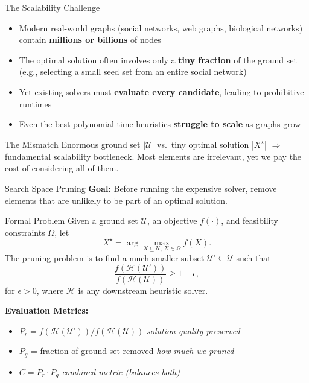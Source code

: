 \documentclass[aspectratio=169,xcolor=dvipsnames,8pt]{beamer}
\begin{document}
\begin{frame}{The Scalability Challenge}
  \begin{itemize}
    \item Modern real-world graphs (social networks, web graphs, biological networks)
      contain \textbf{millions or billions} of nodes
    \item The optimal solution often involves only a \textbf{tiny fraction} of the
      ground set (e.g., selecting a small seed set from an entire social network)
    \item Yet existing solvers must \textbf{evaluate every candidate}, leading to
      prohibitive runtimes
    \item Even the best polynomial-time heuristics \textbf{struggle to scale}
      as graphs grow
  \end{itemize}

  \vspace{0.4cm}

  \begin{alertblock}{The Mismatch}
    Enormous ground set $|\mathcal{U}|$ vs.\ tiny optimal solution $|X^\star|$
    $\Rightarrow$ fundamental scalability bottleneck. Most elements are irrelevant,
    yet we pay the cost of considering all of them.
  \end{alertblock}
\end{frame}

\begin{frame}{Search Space Pruning}
  \textbf{Goal:} Before running the expensive solver, remove elements that are unlikely to
  be part of an optimal solution.

  \vspace{0.3cm}

  \begin{block}{Formal Problem}
    Given a ground set $\mathcal{U}$, an objective $f(\cdot)$, and feasibility
    constraints $\Omega$, let
    \[
      X^\star = \arg\max_{X \subseteq \mathcal{U},\, X \in \Omega} f(X).
    \]
    The pruning problem is to find a much smaller subset $\mathcal{U}' \subseteq \mathcal{U}$
    such that
    \[
      \frac{f\!\left(\mathcal{H}(\mathcal{U}')\right)}{f\!\left(\mathcal{H}(\mathcal{U})\right)} \ge 1 - \epsilon,
    \]
    for $\epsilon > 0$, where $\mathcal{H}$ is any downstream
    heuristic solver.
  \end{block}

  \vspace{0.3cm}

  \textbf{Evaluation Metrics:}
  \begin{itemize}
    \item $P_r = f(\mathcal{H}(\mathcal{U}')) / f(\mathcal{H}(\mathcal{U}))$
      \hfill \textit{solution quality preserved}
    \item $P_g$ = fraction of ground set removed
      \hfill \textit{how much we pruned}
    \item $C = P_r \cdot P_g$
      \hfill \textit{combined metric (balances both)}
  \end{itemize}
\end{frame}
\end{document}
